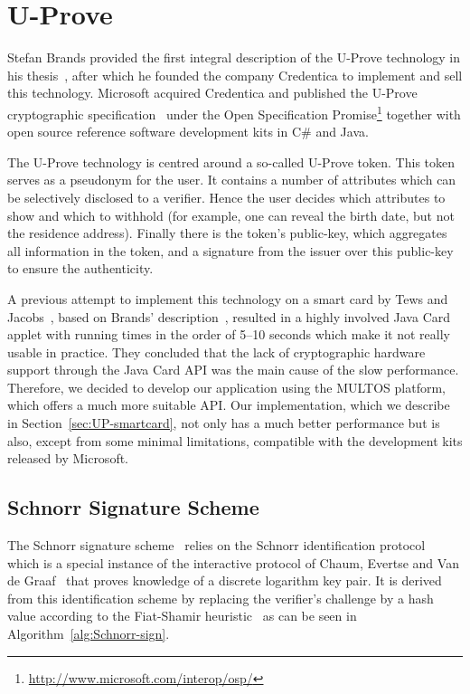 \chapter{U-Prove\label{chp:uprove}}

Stefan Brands provided the first integral description of the U-Prove technology
in his thesis~\cite{Brands2000}, after which he founded the company Credentica
to implement and sell this technology. Microsoft acquired Credentica and
published the U-Prove cryptographic specification~\cite{U-Prove_Crypto2010,
U-Prove_Crypto2013} under the Open Specification Promise\footnote{%
\url{http://www.microsoft.com/interop/osp/}} together with open source reference
software development kits in C\# and Java.

The U-Prove technology is centred around a so-called U-Prove token. This token
serves as a pseudonym for the user. It contains a number of attributes which can
be selectively disclosed to a verifier. Hence the user decides which attributes
to show and which to withhold (for example, one can reveal the birth date, but
not the residence address). Finally there is the token's public-key, which
aggregates all information in the token, and a signature from the issuer over
this public-key to ensure the authenticity.

A previous attempt to implement this technology on a smart card by Tews and
Jacobs~\cite{TewsJacobs09}, based on Brands' description~\cite{Brands2000},
resulted in a highly involved Java Card applet with running times in the order
of 5--10 seconds which make it not really usable in practice. They concluded
that the lack of cryptographic hardware support through the Java Card API was
the main cause of the slow performance. Therefore, we decided to develop our
application using the MULTOS platform, which offers a much more suitable API.
Our implementation, which we describe in Section~\ref{sec:UP-smartcard}, not
only has a much better performance but is also, except from some minimal
limitations, compatible with the development kits released by Microsoft.

\section{Schnorr Signature Scheme}

The Schnorr signature scheme~\cite{Schnorr1989,Schnorr1991} relies on the
Schnorr identification protocol~\cite{Schnorr1989} which is a special instance
of the interactive protocol of Chaum, Evertse and Van de
Graaf~\cite{ChaumEvdG1988} that proves knowledge of a discrete logarithm key
pair. It is derived from this identification scheme by replacing the verifier's
challenge by a hash value according to the Fiat-Shamir
heuristic~\cite{FiatShamir1987} as can be seen in
Algorithm~\ref{alg:Schnorr-sign}.

